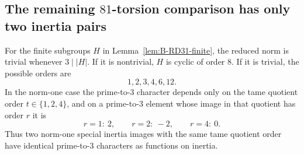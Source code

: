 \subsection{The remaining $81$-torsion comparison has only two inertia pairs}

\begin{lemma}
\label{lem:B-RD32-norm}
For the finite subgroups $H$ in Lemma~\ref{lem:B-RD31-finite},
the reduced norm is trivial whenever $3\mid |H|$.
If it is nontrivial, $H$ is cyclic of order $8$.
If it is trivial, the possible orders are
\[
                           1,2,3,4,6,12.
                                                        \tag{B-RD32.1}
\]
In the norm-one case the prime-to-$3$ character depends only on
the tame quotient order $t\in\{1,2,4\}$, and on a prime-to-$3$
element whose image in that quotient has order $r$ it is
\[
       r=1:\ 2,\qquad r=2:\ -2,\qquad r=4:\ 0.
                                                        \tag{B-RD32.2}
\]
Thus two norm-one special inertia images with the same tame
quotient order have identical prime-to-$3$ characters as
functions on inertia.
\end{lemma}
